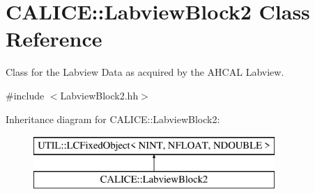 \section{C\-A\-L\-I\-C\-E\-:\-:Labview\-Block2 Class Reference}
\label{classCALICE_1_1LabviewBlock2}


Class for the Labview Data as acquired by the A\-H\-C\-A\-L Labview.  




{\ttfamily \#include $<$Labview\-Block2.\-hh$>$}

Inheritance diagram for C\-A\-L\-I\-C\-E\-:\-:Labview\-Block2\-:\begin{figure}[H]
\begin{center}
\leavevmode
\includegraphics[height=2.000000cm]{classCALICE_1_1LabviewBlock2}
\end{center}
\end{figure}
